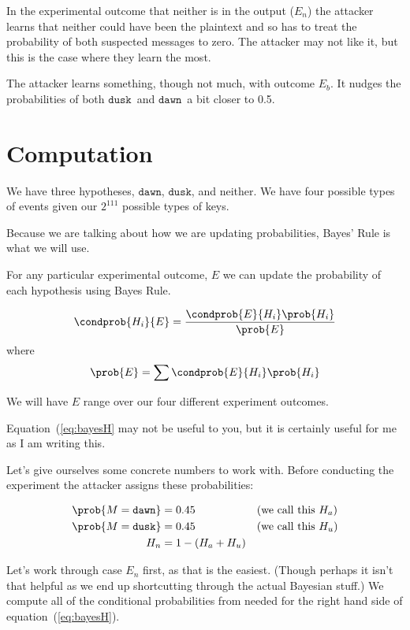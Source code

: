 \documentclass{article}
\newcommand\mdusk{\ensuremath{\mathtt{dusk}}}
\newcommand\mdawn{\ensuremath{\mathtt{dawn}}}
\begin{document}
In the experimental outcome that neither is in the output ($E_n$) the attacker learns
that neither could have been the plaintext and so has to treat the probability of both suspected messages to zero. The attacker may not like it, but this is the case where they learn the most.

The attacker learns something, though not much, with outcome $E_b$.
It nudges the probabilities of both \mdusk\ and \mdawn\ a bit closer to 0.5.

\section{Computation}

We have three hypotheses, \mdawn, \mdusk, and neither.
We have four possible types of events given our $2^{111}$ possible types of keys.

Because we are talking about how we are updating probabilities, Bayes' Rule is what we will use.

For any particular experimental outcome, $E$ we can update the probability of each hypothesis using Bayes Rule.

\begin{equation}\label{eq:bayesH}
    \condprob{H_i}{E} = \frac{\condprob{E}{H_i}\prob{H_i}}{\prob{E}}
\end{equation}
where
\begin{equation}\label{eq:ProbE}
    \prob{E} = \sum \condprob{E}{H_i}\prob{H_i}
\end{equation}

We will have $E$ range over our four different experiment outcomes.

Equation~(\ref{eq:bayesH} may not be useful to you, but it is certainly useful for me as I am writing this.

Let's give ourselves some concrete numbers to work with.
Before conducting the experiment the attacker assigns these probabilities:

\begin{align*}
    \prob{M = \mdawn} &= 0.45 && \text{(we call this $H_a$)} \\
    \prob{M = \mdusk} &= 0.45  && \text{(we call this $H_u$)} \\
    H_n & = 1 - (H_a + H_u) 
\end{align*}

Let's work through case $E_n$ first, as that is the easiest.
(Though perhaps it isn't that helpful as we end up shortcutting through the actual Bayesian stuff.)
We compute all of the conditional probabilities from needed for the right hand side of equation~(\ref{eq:bayesH}).
\end{document}
